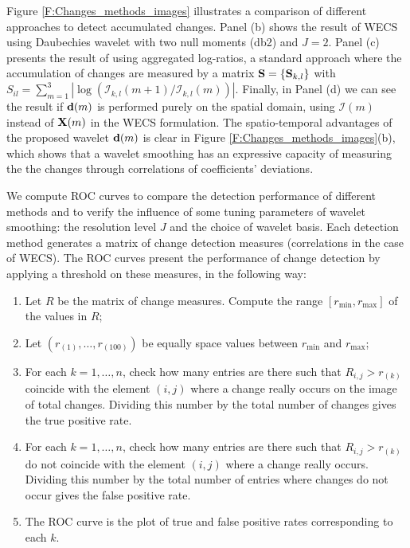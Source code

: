 \documentclass[journal]{IEEEtran}
\newcommand{\vd}{{\textbf d}}
\newcommand{\vS}{{\textbf S}}
\newcommand{\vX}{{\textbf X}}
\begin{document}
Figure \ref{F:Changes_methods_images} illustrates a comparison of different approaches to detect accumulated changes. Panel (b) shows the result of WECS using Daubechies wavelet with two null moments (db2) and $J=2$. Panel (c) presents the result of using aggregated log-ratios, a standard approach where the accumulation of changes are measured by a matrix $\vS=\{\vS_{k,l}\}$ with $S_{il} = \sum_{m=1}^3	|\log\left(\mathcal{I}_{k,l}(m+1)/\mathcal{I}_{k,l}(m)\right)|$. Finally, in Panel (d) we can see the result if $\vd(m)$ is performed purely on the spatial domain, using $\mathcal{I}(m)$ instead of $\vX(m)$ in the WECS formulation. The spatio-temporal advantages of the proposed wavelet  $\vd(m)$ is clear in Figure \ref{F:Changes_methods_images}(b), which shows that a wavelet smoothing has an expressive capacity of measuring the the changes through correlations of coefficients' deviations.


We compute ROC curves to compare the detection performance of different methods and to verify the influence of some tuning parameters of wavelet smoothing: the resolution level $J$ and the choice of wavelet basis. Each detection method generates a matrix of change detection measures (correlations in the case of WECS). The ROC curves present the performance of change detection by applying a threshold on these measures, in the following way:
\begin{enumerate}
\item Let $R$ be the matrix of change measures. Compute the range $[r_{\min},r_{\max}]$ of the values in $R$;
\item Let $(r_{(1)},\ldots,r_{(100)})$ be equally space values between $r_{\min}$ and $r_{\max}$;
\item For each $k=1,\ldots,n$, check how many entries are there such that $R_{i,j}>r_{(k)}$ coincide with the element $(i,j)$ where a change really occurs on the image of total changes. Dividing this number by the total number of changes gives the true positive rate.
\item For each $k=1,\ldots,n$, check how many entries are there such that $R_{i,j}>r_{(k)}$  do not coincide with the element $(i,j)$ where a change really occurs. Dividing this number by the total number of entries where changes do not occur gives the false positive rate.
\item The ROC curve is the plot of true and false positive rates corresponding to each $k$.
\end{enumerate}
\end{document}
